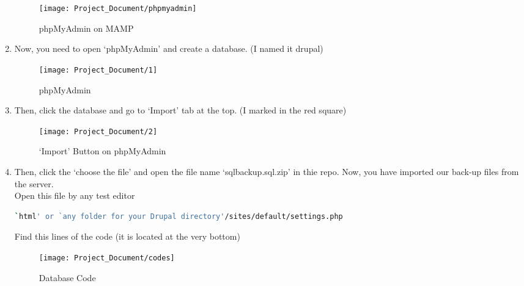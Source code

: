 \documentclass[10pt]{article}
\begin{document}
\begin{enumerate}
                    \begin{figure}[!ht]
                           \centering
                             \texttt{[image: Project\_Document/phpmyadmin]}
                        \caption{phpMyAdmin on MAMP}
                    \end{figure}

                \item Now, you need to open `phpMyAdmin' and create a database. (I named it drupal) 
        
                    \begin{figure}[!ht]
                           \centering
                           \texttt{[image: Project\_Document/1]}
                        \caption{phpMyAdmin}
                    \end{figure}
\newpage                
                \item Then, click the database and go to `Import' tab at the top. (I marked in the red square) 
                
                    \begin{figure}[!ht]
                           \centering
                           \texttt{[image: Project\_Document/2]}
                        \caption{`Import' Button on phpMyAdmin }
                    \end{figure}
                
                \item Then, click the `choose the file' and open the file name `sqlbackup.sql.zip' in thie repo. Now, you have imported our back-up files from the server. \\
                Open this file by any test editor
                
\begin{lstlisting}[language=bash]
`html' or `any folder for your Drupal directory'/sites/default/settings.php
\end{lstlisting}
            
                Find this lines of the code (it is located at the very bottom) \\
               
                    \begin{figure}[!ht]
                           \centering
                           \texttt{[image: Project\_Document/codes]}
                        \caption{Database Code}
                    \end{figure}
            

\end{enumerate}
\end{document}
